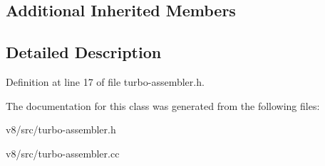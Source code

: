 \subsection*{Additional Inherited Members}


\subsection{Detailed Description}


Definition at line 17 of file turbo-\/assembler.\+h.



The documentation for this class was generated from the following files\+:\begin{DoxyCompactItemize}
\item 
v8/src/turbo-\/assembler.\+h\item 
v8/src/turbo-\/assembler.\+cc\end{DoxyCompactItemize}
